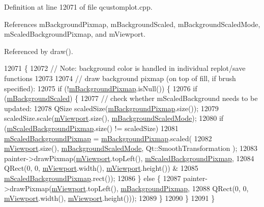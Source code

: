 Definition at line 12071 of file qcustomplot.\+cpp.



References m\+Background\+Pixmap, m\+Background\+Scaled, m\+Background\+Scaled\+Mode, m\+Scaled\+Background\+Pixmap, and m\+Viewport.



Referenced by draw().


\begin{DoxyCode}
12071                                                     \{
12072   \textcolor{comment}{// Note: background color is handled in individual replot/save functions}
12073 
12074   \textcolor{comment}{// draw background pixmap (on top of fill, if brush specified):}
12075   \textcolor{keywordflow}{if} (!\hyperlink{class_q_custom_plot_ae8f4677399324a78c5f8dbfb95a34f90}{mBackgroundPixmap}.isNull()) \{
12076     \textcolor{keywordflow}{if} (\hyperlink{class_q_custom_plot_a62fe584b20680b1b2e1c7efb5c5416a5}{mBackgroundScaled}) \{
12077       \textcolor{comment}{// check whether mScaledBackground needs to be updated:}
12078       QSize scaledSize(\hyperlink{class_q_custom_plot_ae8f4677399324a78c5f8dbfb95a34f90}{mBackgroundPixmap}.size());
12079       scaledSize.scale(\hyperlink{class_q_custom_plot_ac0a7c38a715526c257cff95774f83ab6}{mViewport}.size(), \hyperlink{class_q_custom_plot_ab82e8a5e3ad6b486f95d6da8bf49e9aa}{mBackgroundScaledMode});
12080       \textcolor{keywordflow}{if} (\hyperlink{class_q_custom_plot_a081bf046501d52642dc6d7e3bdb97d57}{mScaledBackgroundPixmap}.size() != scaledSize)
12081         \hyperlink{class_q_custom_plot_a081bf046501d52642dc6d7e3bdb97d57}{mScaledBackgroundPixmap} = \hyperlink{class_q_custom_plot_ae8f4677399324a78c5f8dbfb95a34f90}{mBackgroundPixmap}.scaled(
12082             \hyperlink{class_q_custom_plot_ac0a7c38a715526c257cff95774f83ab6}{mViewport}.size(), \hyperlink{class_q_custom_plot_ab82e8a5e3ad6b486f95d6da8bf49e9aa}{mBackgroundScaledMode}, Qt::SmoothTransformation
      );
12083       painter->drawPixmap(\hyperlink{class_q_custom_plot_ac0a7c38a715526c257cff95774f83ab6}{mViewport}.topLeft(), \hyperlink{class_q_custom_plot_a081bf046501d52642dc6d7e3bdb97d57}{mScaledBackgroundPixmap},
12084                           QRect(0, 0, \hyperlink{class_q_custom_plot_ac0a7c38a715526c257cff95774f83ab6}{mViewport}.width(), \hyperlink{class_q_custom_plot_ac0a7c38a715526c257cff95774f83ab6}{mViewport}.height()) &
12085                               \hyperlink{class_q_custom_plot_a081bf046501d52642dc6d7e3bdb97d57}{mScaledBackgroundPixmap}.rect());
12086     \} \textcolor{keywordflow}{else} \{
12087       painter->drawPixmap(\hyperlink{class_q_custom_plot_ac0a7c38a715526c257cff95774f83ab6}{mViewport}.topLeft(), \hyperlink{class_q_custom_plot_ae8f4677399324a78c5f8dbfb95a34f90}{mBackgroundPixmap},
12088                           QRect(0, 0, \hyperlink{class_q_custom_plot_ac0a7c38a715526c257cff95774f83ab6}{mViewport}.width(), \hyperlink{class_q_custom_plot_ac0a7c38a715526c257cff95774f83ab6}{mViewport}.height()));
12089     \}
12090   \}
12091 \}
\end{DoxyCode}



